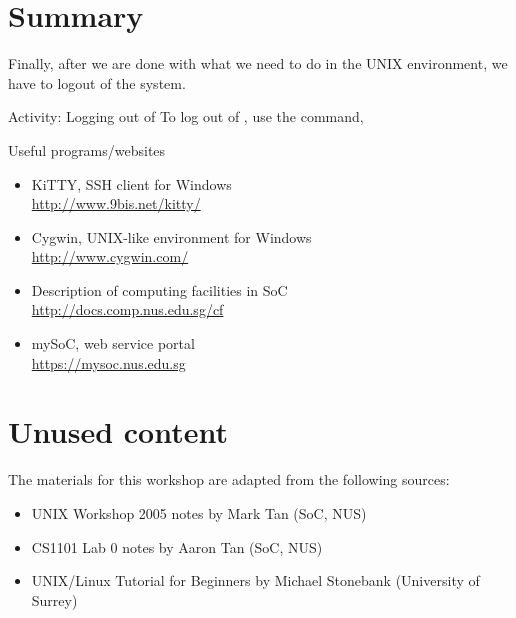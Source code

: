 \section{Summary} %


Finally, after we are done with what we need to do in the UNIX environment, we
have to logout of the system.  

\begin{frame}{Activity: Logging out of }
To log out of , use the  command, 
\end{frame}

\begin{frame}{Useful programs/websites}
\begin{itemize}
\item KiTTY, SSH client for Windows\\ \url{http://www.9bis.net/kitty/}
\item Cygwin, UNIX-like environment for Windows\\ \url{http://www.cygwin.com/}
\item Description of computing facilities in SoC\\ \url{http://docs.comp.nus.edu.sg/cf}
\item mySoC, web service portal\\ \url{https://mysoc.nus.edu.sg}
\end{itemize}
\end{frame}
















\section{Unused content}

\begin{frame}
The materials for this workshop are adapted from the following sources:
\begin{itemize}
\item UNIX Workshop 2005 notes by Mark Tan (SoC, NUS)
\item CS1101 Lab 0 notes by Aaron Tan (SoC, NUS)
\item UNIX/Linux Tutorial for Beginners by Michael Stonebank (University of Surrey)
\end{itemize}
\end{frame}

